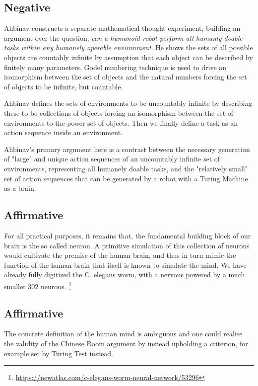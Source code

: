 \documentclass{article}
\begin{document}
\subsection*{Negative}
Ahbinav constructs a separate mathematical thought experiment, building an argument over the question; \emph{can a humanoid robot perform all humanly doable tasks within any humanely operable environment}. He shows the sets of all possible objects are countably infinite by assumption that each object can be described by finitely many parameters. Godel numbering technique is used to drive an isomorphism between the set of objects and the natural numbers forcing the set of objects to be infinite, but countable.

Ahbinav defines the sets of environments to be uncountably infinite by describing these to be collections of objects forcing an isomorphism between the set of environments to the power set of objects. Then we finally define a task as an action sequence inside an environment. 

Ahbinav's primary argument here is a contrast between the necessary generation of "large" and unique action sequences of an uncountably infinite set of environments, representing all humanely doable tasks, and the "relatively small" set of action sequences that can be generated by a robot with a Turing Machine as a brain.

\subsection*{Affirmative}
For all practical purposes, it remains that, the fundamental building block of our brain is the so called neuron. A primitive simulation of this collection of neurons would cultivate the premise of the human brain, and thus in turn mimic the function of the human brain that itself is known to simulate the mind. We have already fully digitized the C. elegans worm, with a nervous powered by a much smaller 302 neurons. \footnote{\url{https://newatlas.com/c-elegans-worm-neural-network/53296}}

\subsection*{Affirmative}
The concrete definition of the human mind is ambiguous and one could realise the validity of the Chinese Room  argument \cite{chinese_room} by instead upholding a criterion, for example set by Turing Test instead. \cite{turing_test}
\end{document}
